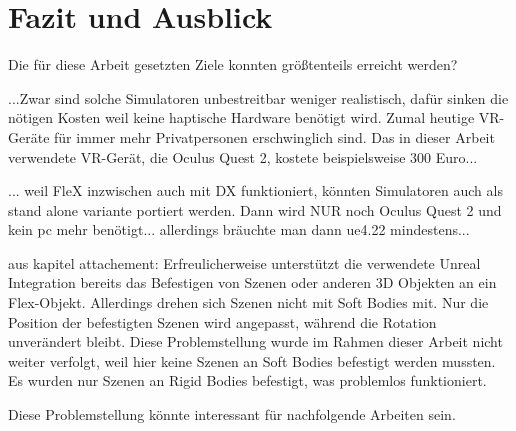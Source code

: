 \chapter{Fazit und Ausblick}

Die für diese Arbeit gesetzten Ziele konnten größtenteils erreicht werden?

...Zwar sind solche Simulatoren unbestreitbar weniger realistisch, dafür sinken die nötigen Kosten weil keine haptische Hardware benötigt wird. Zumal heutige VR-Geräte für immer mehr Privatpersonen erschwinglich sind. Das in dieser Arbeit verwendete VR-Gerät, die Oculus Quest 2, kostete beispielsweise 300 Euro...

... weil FleX inzwischen auch mit DX funktioniert, könnten Simulatoren auch als stand alone variante portiert werden. Dann wird NUR  noch Oculus Quest 2 und kein pc mehr benötigt... allerdings bräuchte man dann ue4.22 mindestens...


aus kapitel attachement:
Erfreulicherweise unterstützt die verwendete Unreal Integration bereits das Befestigen von Szenen oder anderen 3D Objekten an ein Flex-Objekt. Allerdings drehen sich Szenen nicht mit Soft Bodies mit. Nur die Position der befestigten Szenen wird angepasst, während die Rotation unverändert bleibt. 
Diese Problemstellung wurde im Rahmen dieser Arbeit nicht weiter verfolgt, weil hier keine Szenen an Soft Bodies befestigt werden mussten. Es wurden nur Szenen an Rigid Bodies befestigt, was problemlos funktioniert.

Diese Problemstellung könnte interessant für nachfolgende Arbeiten sein.


